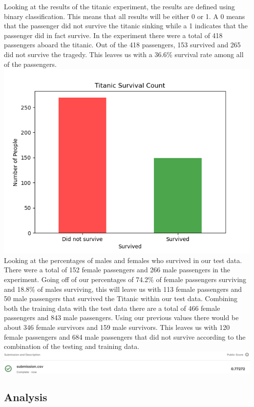 \documentclass{IEEE}
\begin{document}
Looking at the results of the titanic experiment, the results are defined using binary classification. This means that all results will be either 0 or 1. A 0 means that the passenger did not survive the titanic sinking while a 1 indicates that the passenger did in fact survive. In the experiment there were a total of 418 passengers aboard the titanic. Out of the 418 passengers, 153 survived and 265 did not survive the tragedy. This leaves us with a 36.6\% survival rate among all of the passengers.
\includegraphics[scale=0.54]{./barchart2}
Looking at the percentages of males and females who survived in our test data. There were a total of 152 female passengers and 266 male passengers in the experiment. Going off of our percentages of 74.2\% of female passengers surviving and 18.8\% of males surviving, this will leave us with 113 female passengers and 50 male passengers that survived the Titanic within our test data. Combining both the training data with the test data there are a total of 466 female passengers and 843 male passengers. Using our previous values there would be about 346 female survivors and 159 male survivors. This leaves us with 120 female passengers and 684 male passengers that did not survive according to the combination of the testing and training data.
\includegraphics[scale=0.215]{./results.png}
\subsection{Analysis}
\end{document}
